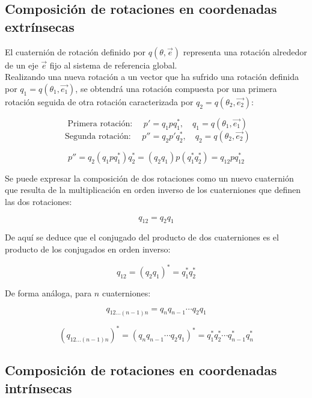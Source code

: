 \documentclass[12pt, a4paper]{report}
\begin{document}
\subsection{Composición de rotaciones en coordenadas extrínsecas}

El cuaternión de rotación definido por $q\left(\theta, \vec{e}\right)$ representa una rotación alrededor de un eje $\vec{e}$ fijo al sistema de referencia global.\\

Realizando una nueva rotación a un vector que ha sufrido una rotación definida por $q_1 = q\left(\theta_1, \vec{e_1}\right)$, se obtendrá una rotación compuesta por una primera rotación seguida de otra rotación caracterizada por $q_2 = q\left(\theta_2, \vec{e_2} \right)$:

$$ \text{ Primera rotación: } \quad p' = q_1pq_1^*, \quad q_1 = q(\theta_1, \vec{e_1}) $$
$$ \text{ Segunda rotación: }\quad p'' = q_2p'q_2^*, \quad q_2 = q(\theta_2, \vec{e_2}) $$

\begin{equation}
p'' = q_2(q_1pq_1^*)q_2^* = (q_2q_1)p(q_1^*q_2^*) = q_{12}pq_{12}^*
\end{equation}

Se puede expresar la composición de dos rotaciones como un nuevo cuaternión que resulta de la multiplicación en orden inverso de los cuaterniones que definen las dos rotaciones:

\begin{equation}
q_{12} = q_2 q_1
\end{equation}

De aquí se deduce que el conjugado del producto de dos cuaterniones es el producto de los conjugados en orden inverso:

\begin{equation}
q_{12} = \left(q_2q_1\right)^* = q_1^*q_2^*
\end{equation}

De forma análoga, para $n$ cuaterniones:

\begin{equation}
q_{12 \dotsc (n-1)n} = q_nq_{n-1} \dotsm q_2q_1
\end{equation}

\begin{equation}
\left( q_{12 \dotsc (n-1)n} \right)^* = \left( q_nq_{n-1} \dotsm q_2q_1 \right)^* = q_1^*q_2^* \dotsm q_{n-1}^*q_n^*
\end{equation}

\subsection{Composición de rotaciones en coordenadas intrínsecas}
\end{document}
